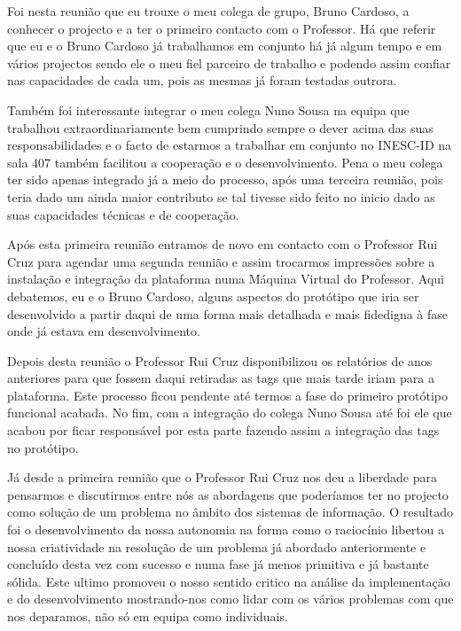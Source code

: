 \documentclass[a4paper,12pt,journal,twoside,compsoc]{PPIEEEtran}
\begin{document}
Foi nesta reunião que eu trouxe o meu colega de grupo, Bruno Cardoso, a conhecer o projecto e a ter o primeiro contacto com o Professor. Há que referir que eu e o Bruno Cardoso já trabalhamos em conjunto há já algum tempo e em vários projectos sendo ele o meu fiel parceiro de trabalho e podendo assim confiar nas capacidades de cada um, pois as mesmas já foram testadas outrora.

Também foi interessante integrar o meu colega Nuno Sousa na equipa que trabalhou extraordinariamente bem cumprindo sempre o dever acima das suas responsabilidades e o facto de estarmos a trabalhar em conjunto no \ac{INESC-ID} na sala 407 também facilitou a cooperação e o desenvolvimento. Pena o meu colega ter sido apenas integrado já a meio do processo, após uma terceira reunião, pois teria dado um ainda maior contributo se tal tivesse sido feito no inicio dado as suas capacidades técnicas e de cooperação.

Após esta primeira reunião entramos de novo em contacto com o Professor Rui Cruz para agendar uma segunda reunião e assim trocarmos impressões sobre a instalação e integração da plataforma numa Máquina Virtual do Professor. Aqui debatemos, eu e o Bruno Cardoso, alguns aspectos do protótipo que iria ser desenvolvido a partir daqui de uma forma mais detalhada e mais fidedigna à fase onde já estava em desenvolvimento.

Depois desta reunião o Professor Rui Cruz disponibilizou os relatórios de anos anteriores para que fossem daqui retiradas as tags que mais tarde iriam para a plataforma. Este processo ficou pendente até termos a fase do primeiro protótipo funcional acabada. No fim, com a integração do colega Nuno Sousa até foi ele que acabou por ficar responsável por esta parte fazendo assim a integração das tags no protótipo.

Já desde a primeira reunião que o Professor Rui Cruz nos deu a liberdade para pensarmos e discutirmos entre nós as abordagens que poderíamos ter no projecto como solução de um problema no âmbito dos sistemas de informação. O resultado foi o desenvolvimento da nossa autonomia na forma como o raciocínio libertou a nossa criatividade na resolução de um problema já abordado anteriormente e concluído desta vez com sucesso e numa fase já menos primitiva e já bastante sólida. Este ultimo promoveu o nosso sentido critico na análise da implementação e do desenvolvimento mostrando-nos como lidar com os vários problemas com que nos deparamos, não só em equipa como individuais.
\end{document}
